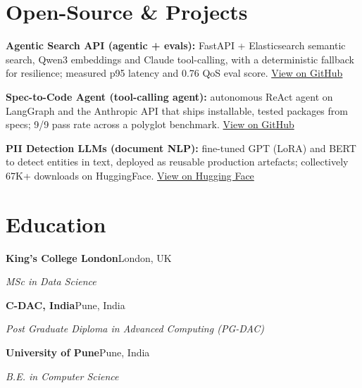 \documentclass[10pt,a4paper]{article}
\begin{document}
\section{Open-Source \& Projects}
\begin{tight}
  \item \textbf{Agentic Search API (agentic + evals):} FastAPI + Elasticsearch semantic search, Qwen3 embeddings and Claude tool-calling, with a deterministic fallback for resilience; measured p95 latency and 0.76 QoS eval score. \href{https://github.com/abhijeetscode/search-agent}{View on GitHub}
  \item \textbf{Spec-to-Code Agent (tool-calling agent):} autonomous ReAct agent on LangGraph and the Anthropic API that ships installable, tested packages from specs; 9/9 pass rate across a polyglot benchmark. \href{https://github.com/abhijeetscode/Spec-to-Code-Agent}{View on GitHub}
  \item \textbf{PII Detection LLMs (document NLP):} fine-tuned GPT (LoRA) and BERT to detect entities in text, deployed as reusable production artefacts; collectively 67K+ downloads on HuggingFace. \href{https://huggingface.co/ab-ai/pii_model}{View on Hugging Face}
\end{tight}

\section{Education}
{\color{company}\bfseries King's College London}\hfill {\color{muted}London, UK}\par
{\itshape MSc in Data Science}\par\vspace{2pt}
{\color{company}\bfseries C-DAC, India}\hfill {\color{muted}Pune, India}\par
{\itshape Post Graduate Diploma in Advanced Computing (PG-DAC)}\par\vspace{2pt}
{\color{company}\bfseries University of Pune}\hfill {\color{muted}Pune, India}\par
{\itshape B.E. in Computer Science}\par
\end{document}
